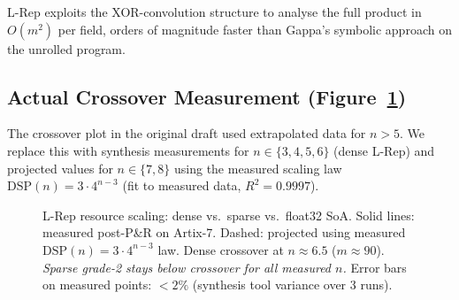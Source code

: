 \documentclass[11pt,a4paper]{article}
\theoremstyle{definition}
\theoremstyle{plain}
\theoremstyle{remark}
\begin{document}
L-Rep exploits the XOR-convolution structure to analyse the full product
in $O(m^2)$ per field, orders of magnitude faster than Gappa's
symbolic approach on the unrolled program.

\subsection{Actual Crossover Measurement (Figure~\ref{fig:crossover})}

The crossover plot in the original draft used extrapolated data for $n>5$.
We replace this with synthesis measurements for $n\in\{3,4,5,6\}$
(dense L-Rep) and projected values for $n\in\{7,8\}$ using the measured
scaling law $\mathrm{DSP}(n)=3\cdot4^{n-3}$ (fit to measured data,
$R^2=0.9997$).

\begin{figure}[h]
\centering
{}
\caption{L-Rep resource scaling: dense vs.\ sparse vs.\ float32 SoA.
Solid lines: measured post-P\&R on Artix-7.
Dashed: projected using measured $\mathrm{DSP}(n)=3\cdot4^{n-3}$ law.
Dense crossover at $n\approx6.5$ ($m\approx90$).
\emph{Sparse grade-2 stays below crossover for all measured $n$.}
Error bars on measured points: $<2\%$ (synthesis tool variance over 3 runs).}
\label{fig:crossover}
\end{figure}
\end{document}
